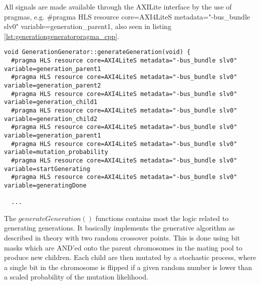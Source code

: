 All signals are made available through the AXILite interface by the use of pragmas, e.g. \#pragma HLS resource core=AXI4LiteS metadata="-bus\_bundle slv0" variable=generation\_parent1, also seen in listing \ref{lst:generationgeneratorpragma_cpp}.

\begin{lstlisting}[style=customc++,caption=Pragmas defined for the GenerationGenerator function generateGeneration().,label={lst:generationgeneratorpragma_cpp}]
void GenerationGenerator::generateGeneration(void) {
  #pragma HLS resource core=AXI4LiteS metadata="-bus_bundle slv0" variable=generation_parent1
  #pragma HLS resource core=AXI4LiteS metadata="-bus_bundle slv0" variable=generation_parent2
  #pragma HLS resource core=AXI4LiteS metadata="-bus_bundle slv0" variable=generation_child1
  #pragma HLS resource core=AXI4LiteS metadata="-bus_bundle slv0" variable=generation_child2
  #pragma HLS resource core=AXI4LiteS metadata="-bus_bundle slv0" variable=generation_parent1
  #pragma HLS resource core=AXI4LiteS metadata="-bus_bundle slv0" variable=mutation_probability
  #pragma HLS resource core=AXI4LiteS metadata="-bus_bundle slv0" variable=startGenerating
  #pragma HLS resource core=AXI4LiteS metadata="-bus_bundle slv0" variable=generatingDone

  ...
\end{lstlisting}  

The $generateGeneration()$ functions contains most the logic related to generating generations. It basically implements the generative algorithm as described in theory with two random crossover points. This is done using bit masks which are AND'ed onto the parent chromosomes in the mating pool to produce new children. Each child are then mutated by a stochastic process, where a single bit in the chromosome is flipped if a given random number is lower than a scaled probability of the mutation likelihood.

